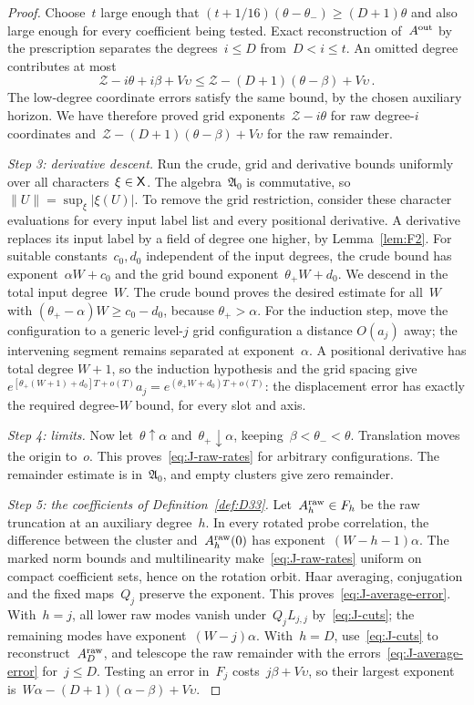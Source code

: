 \begin{proof}
Choose~$t$ large enough that $(t+1/16)(\theta-\theta_-)\ge(D+1)\theta$ and also large enough for every coefficient being tested. Exact reconstruction of~$A^{\rm out}$ by the prescription separates the degrees~$i\le D$ from~$D<i\le t$. An omitted degree contributes at most
\begin{equation*}
\mathcal Z-i\theta+i\beta+V\upsilon\le \mathcal Z-(D+1)(\theta-\beta)+V\upsilon\,.
\end{equation*}
The low-degree coordinate errors satisfy the same bound, by the chosen auxiliary horizon. We have therefore proved grid exponents~$\mathcal Z-i\theta$ for raw degree-$i$ coordinates and~$\mathcal Z-(D+1)(\theta-\beta)+V\upsilon$ for the raw remainder.

\emph{Step 3: derivative descent.} Run the crude, grid and derivative bounds uniformly over all characters~$\xi\in\mathsf{X}$. The algebra~$\mathfrak A_0$ is commutative, so $\|U\|=\sup_\xi|\xi(U)|$. To remove the grid restriction, consider these character evaluations for every input label list and every positional derivative. A derivative replaces its input label by a field of degree one higher, by Lemma~\ref{lem:F2}. For suitable constants~$c_0,d_0$ independent of the input degrees, the crude bound has exponent~$\alpha W+c_0$ and the grid bound exponent~$\theta_+W+d_0$. We descend in the total input degree~$W$. The crude bound proves the desired estimate for all~$W$ with $(\theta_+-\alpha)W\ge c_0-d_0$, because $\theta_+>\alpha$. For the induction step, move the configuration to a generic level-$j$ grid configuration a distance $O(a_j)$ away; the intervening segment remains separated at exponent~$\alpha$. A positional derivative has total degree $W+1$, so the induction hypothesis and the grid spacing give $e^{[\theta_+(W+1)+d_0]T+o(T)}a_j=e^{(\theta_+W+d_0)T+o(T)}$: the displacement error has exactly the required degree-$W$ bound, for every slot and axis.

\emph{Step 4: limits.} Now let~$\theta\uparrow \alpha$ and~$\theta_+\downarrow \alpha$, keeping~$\beta<\theta_-<\theta$. Translation moves the origin to~$o$. This proves~\eqref{eq:J-raw-rates} for arbitrary configurations. The remainder estimate is in~$\mathfrak A_0$, and empty clusters give zero remainder.

\emph{Step 5: the coefficients of Definition~\ref{def:D33}.} Let~$A^{\rm raw}_h\in F_h$ be the raw truncation at an auxiliary degree~$h$. In every rotated probe correlation, the difference between the cluster and~$A^{\rm raw}_h(0)$ has exponent~$(W-h-1)\alpha$. The marked norm bounds and multilinearity make~\eqref{eq:J-raw-rates} uniform on compact coefficient sets, hence on the rotation orbit. Haar averaging, conjugation and the fixed maps~$Q_j$ preserve the exponent. This proves~\eqref{eq:J-average-error}. With~$h=j$, all lower raw modes vanish under~$Q_jL_{j,j}$ by~\eqref{eq:J-cuts}; the remaining modes have exponent~$(W-j)\alpha$. With~$h=D$, use~\eqref{eq:J-cuts} to reconstruct~$A^{\rm raw}_D$, and telescope the raw remainder with the errors~\eqref{eq:J-average-error} for~$j\le D$. Testing an error in~$F_j$ costs~$j\beta+V\upsilon$, so their largest exponent is~$W\alpha-(D+1)(\alpha-\beta)+V\upsilon$.
\label{proof:J-power-end}
\end{proof}

